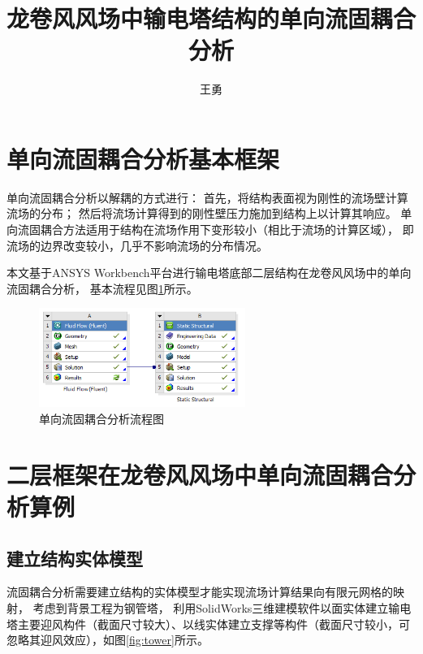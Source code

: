\documentclass{ctexart}
\title{龙卷风风场中输电塔结构的单向流固耦合分析}
\author{王勇}
\date{}
\begin{document}
\graphicspath{{figures/}}

\maketitle

\section{单向流固耦合分析基本框架}
单向流固耦合分析以解耦的方式进行\cite{benra2011comparison,qian2008fsi}：
首先，将结构表面视为刚性的流场壁计算流场的分布；
然后将流场计算得到的刚性壁压力施加到结构上以计算其响应。
单向流固耦合方法适用于结构在流场作用下变形较小（相比于流场的计算区域），
即流场的边界改变较小，几乎不影响流场的分布情况。

本文基于ANSYS Workbench平台进行输电塔底部二层结构在龙卷风风场中的单向流固耦合分析\cite{cornell2016fsi1, cornell2016fsi2}，
基本流程见图\ref{fig:fsi-chart}所示。

\begin{figure}[!htpb]\label{fig:fsi-chart}
  \centering
  \includegraphics[width=0.6\textwidth]{fsi-chart.png}
  \caption{单向流固耦合分析流程图}
\end{figure}

\section{二层框架在龙卷风风场中单向流固耦合分析算例}

\subsection{建立结构实体模型}
流固耦合分析需要建立结构的实体模型才能实现流场计算结果向有限元网格的映射，
考虑到背景工程为钢管塔，
利用SolidWorks三维建模软件以面实体建立输电塔主要迎风构件（截面尺寸较大）、以线实体建立支撑等构件（截面尺寸较小，可忽略其迎风效应），如图\ref{fig:tower}所示。
\end{document}
